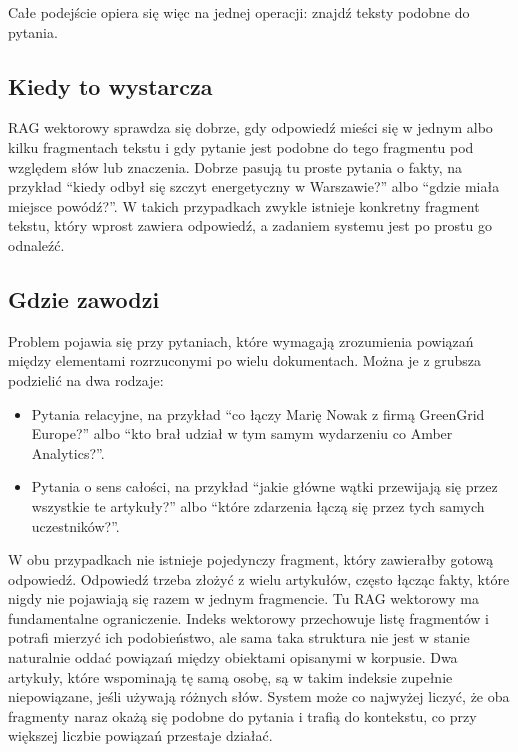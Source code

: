 \documentclass[11pt,a4paper]{article}
\begin{document}
Całe podejście opiera się więc na jednej operacji: znajdź teksty podobne do pytania.

\subsection{Kiedy to wystarcza}

RAG wektorowy sprawdza się dobrze, gdy odpowiedź mieści się w jednym albo kilku fragmentach
tekstu i gdy pytanie jest podobne do tego fragmentu pod względem słów lub znaczenia. Dobrze
pasują tu proste pytania o fakty, na przykład \enquote{kiedy odbył się szczyt energetyczny
w Warszawie?} albo \enquote{gdzie miała miejsce powódź?}. W takich przypadkach zwykle
istnieje konkretny fragment tekstu, który wprost zawiera odpowiedź, a zadaniem systemu jest
po prostu go odnaleźć.

\subsection{Gdzie zawodzi}

Problem pojawia się przy pytaniach, które wymagają zrozumienia powiązań między elementami
rozrzuconymi po wielu dokumentach. Można je z grubsza podzielić na dwa rodzaje:

\begin{itemize}[itemsep=3pt]
  \item Pytania relacyjne, na przykład \enquote{co łączy Marię Nowak z firmą GreenGrid
        Europe?} albo \enquote{kto brał udział w tym samym wydarzeniu co Amber Analytics?}.
  \item Pytania o sens całości, na przykład \enquote{jakie główne wątki przewijają się
        przez wszystkie te artykuły?} albo \enquote{które zdarzenia łączą się przez tych
        samych uczestników?}.
\end{itemize}

W obu przypadkach nie istnieje pojedynczy fragment, który zawierałby gotową odpowiedź.
Odpowiedź trzeba złożyć z wielu artykułów, często łącząc fakty, które nigdy nie pojawiają się
razem w jednym fragmencie. Tu RAG wektorowy ma fundamentalne ograniczenie. Indeks wektorowy
przechowuje listę fragmentów i potrafi mierzyć ich podobieństwo, ale sama taka struktura nie
jest w stanie naturalnie oddać powiązań między obiektami opisanymi w korpusie. Dwa artykuły,
które wspominają tę samą osobę, są w takim indeksie zupełnie niepowiązane, jeśli używają
różnych słów. System może co najwyżej liczyć, że oba fragmenty
naraz okażą się podobne do pytania i trafią do kontekstu, co przy większej liczbie powiązań
przestaje działać.
\end{document}
